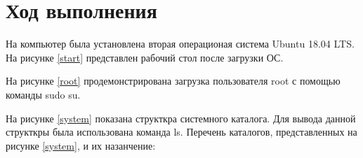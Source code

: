 \section{Ход выполнения}

На компьютер была установлена вторая операционая система Ubuntu 18.04 LTS. На рисунке \ref{start} представлен рабочий стол после загрузки ОС.

На рисунке \ref{root} продемонстрирована загрузка пользователя root с помощью команды sudo su.

На рисунке \ref{system} показана структкра системного каталога. Для вывода данной структкры была использована команда ls.
Перечень каталогов, представленных на рисунке \ref{system}, и их назанчение:
